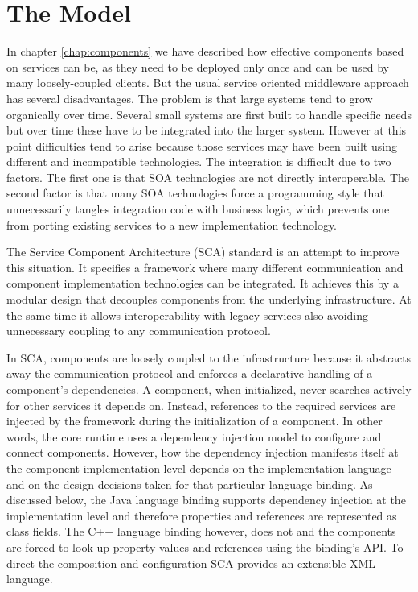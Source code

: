 
\section{The Model}
In chapter \ref{chap:components} we have described how effective components based on services can be, as they need to be deployed only
once and can be used by many loosely-coupled clients. But the usual service oriented middleware approach has several disadvantages.
The problem is that large systems tend to grow organically over time. Several small systems are first built to handle specific needs
but over time these have to be integrated into the larger system. However at this point difficulties tend to arise because
those services may have been built using different and incompatible technologies. The integration is difficult due to two
factors. The first one is that SOA technologies are not directly interoperable. The second factor is that many SOA technologies
force a programming style that unnecessarily tangles integration code with business logic, which prevents one from porting
existing services to a new implementation technology.

The Service Component Architecture (SCA) standard is an attempt to improve this situation. It specifies a framework
where many different communication and component implementation technologies can be integrated. It achieves this
by a modular design that decouples components from the underlying infrastructure. At the same time it allows
interoperability with legacy services also avoiding unnecessary coupling to any communication protocol.

In SCA, components are loosely coupled to the infrastructure because it abstracts away the communication protocol
and enforces a declarative handling of a component's dependencies. A component, when initialized, never searches
actively for other services it depends on. Instead, references to the required services are injected by the framework
during the initialization of a component. In other words, the core runtime uses a dependency injection model to
configure and connect components. However, how the dependency injection manifests itself at the component implementation
level depends on the implementation language and on the design decisions taken for that particular language binding.
As discussed below, the Java language binding supports dependency injection at the implementation level and therefore
properties and references are represented as class fields. The C++ language binding however, does not and the components
are forced to look up property values and references using the binding's API.
To direct the composition and configuration SCA provides an extensible XML language.

